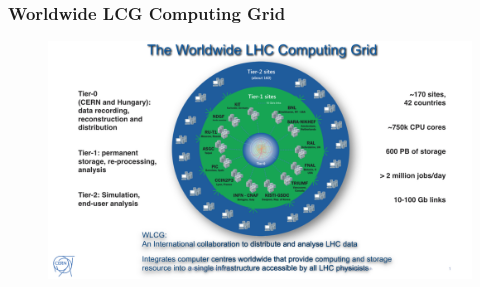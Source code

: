 \begin{frame}
\frametitle{Worldwide LCG Computing Grid}

\begin{figure}[htbp]
\begin{center}
\includegraphics[width=1.0\textwidth]{images/WLCG-2017.png}
\end{center}
\end{figure}
\end{frame}


